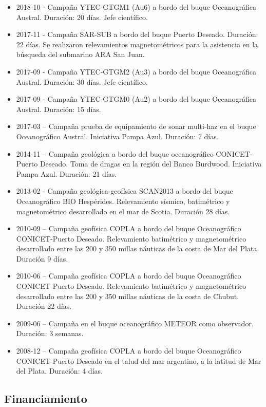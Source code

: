 \documentclass[11pt, a4paper]{article}
\begin{document}
\begin{itemize}
    \item 2018-10 - Campaña YTEC-GTGM1 (Au6) a bordo del buque Oceanográfica Austral. Duración: 20 días. Jefe científico.
    \item 2017-11 - Campaña SAR-SUB a bordo del buque Puerto Deseado. Duración: 22 días. Se realizaron relevamientos magnetométricos para la asistencia en la búsqueda del submarino ARA San Juan.
    \item 2017-09 - Campaña YTEC-GTGM2 (Au3) a bordo del buque Oceanográfica Austral. Duración: 30 días. Jefe científico.
    \item 2017-09 - Campaña YTEC-GTGM0 (Au2) a bordo del buque Oceanográfica Austral. Duración: 15 días.
    \item 2017-03 – Campaña prueba de equipamiento de sonar multi-haz en el buque Oceanográfico Austral. Iniciativa Pampa Azul. Duración: 7 días.
    \item 2014-11 – Campaña geológica a bordo del buque oceanográfico CONICET-Puerto Deseado. Toma de dragas en la región del Banco Burdwood. Iniciativa Pampa Azul. Duración: 21 días.
    \item 2013-02 - Campaña geológica-geofísica SCAN2013 a bordo del buque Oceanográfico BIO Hespérides. Relevamiento sísmico, batimétrico y magnetométrico desarrollado en el mar de Scotia. Duración 28 días.
    \item 2010-09 – Campaña geofísica COPLA a bordo del buque Oceanográfico CONICET-Puerto Deseado. Relevamiento batimétrico y magnetométrico desarrollado entre las 200 y 350 millas náuticas de la costa de Mar del Plata. Duración 9 días.
    \item 2010-06 – Campaña geofísica COPLA a bordo del buque Oceanográfico CONICET-Puerto Deseado. Relevamiento batimétrico y magnetométrico desarrollado entre las 200 y 350 millas náuticas de la costa de Chubut. Duración 22 días.
    \item 2009-06 – Campaña en el buque oceanográfico METEOR como observador. Duración: 3 semanas.
    \item 2008-12 – Campaña geofísica COPLA a bordo del buque Oceanográfico CONICET-Puerto Deseado en el talud del mar argentino, a la latitud de Mar del Plata. Duración: 4 días.
\end{itemize}


\subsection{Financiamiento}
\end{document}

